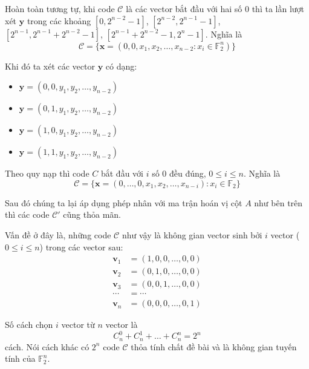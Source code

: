 Hoàn toàn tương tự, khi code $\mathcal{C}$ là các vector bắt đầu với hai số 0 thì ta lần lượt xét $\bm{y}$ trong các khoảng $[0, 2^{n-2}-1]$, $[2^{n-2}, 2^{n-1}-1]$, $[2^{n-1}, 2^{n-1} + 2^{n-2}-1]$, $[2^{n-1} + 2^{n-2} - 1, 2^n-1]$. Nghĩa là
\begin{equation*}
    \mathcal{C} = \{ \bm{x} = (0, 0, x_1, x_2, \ldots, x_{n-2}: x_i \in \mathbb{F}_2^n) \}
\end{equation*}

Khi đó ta xét các vector $\bm{y}$ có dạng:

\begin{itemize}
    \item $\bm{y} = (0, 0, y_1, y_2, \ldots, y_{n-2})$
    \item $\bm{y} = (0, 1, y_1, y_2, \ldots, y_{n-2})$
    \item $\bm{y} = (1, 0, y_1, y_2, \ldots, y_{n-2})$
    \item $\bm{y} = (1, 1, y_1, y_2, \ldots, y_{n-2})$
\end{itemize}

Theo quy nạp thì code $C$ bắt đầu với $i$ số 0 đều đúng, $0 \leqslant i \leqslant n$. Nghĩa là
\begin{equation*}
    \mathcal{C} = \{ \bm{x} = (0, \ldots, 0, x_1, x_2, \ldots, x_{n-i}): x_i \in \mathbb{F}_2 \}
\end{equation*}

Sau đó chúng ta lại áp dụng phép nhân với ma trận hoán vị cột $A$ như bên trên thì các code $\mathcal{C}'$ cũng thỏa mãn.

Vấn đề ở đây là, những code $\mathcal{C}$ như vậy là không gian vector sinh bởi $i$ vector ($0 \leqslant i \leqslant n$) trong các vector sau:
\begin{align*}
    \bm{v}_1 & = (1, 0, 0, \ldots, 0, 0) \\ 
    \bm{v}_2 & = (0, 1, 0, \ldots, 0, 0) \\ 
    \bm{v}_3 & = (0, 0, 1, \ldots, 0, 0) \\ 
    \cdots & = \cdots \\ 
    \bm{v}_n & = (0, 0, 0, \ldots, 0, 1)
\end{align*}

Số cách chọn $i$ vector từ $n$ vector là \[ C_n^0 + C_n^1 + \ldots + C_n^n = 2^n \] cách. Nói cách khác có $2^n$ code $\mathcal{C}$ thỏa tính chất đề bài và là không gian tuyến tính của $\mathbb{F}_2^n$.

